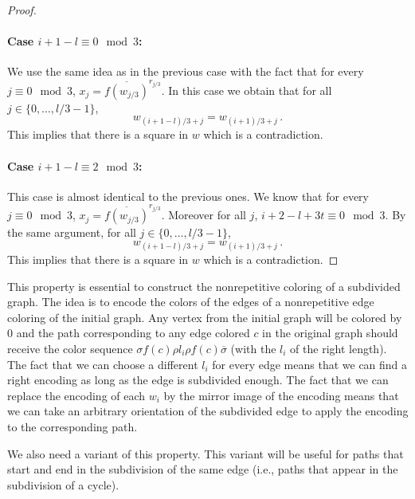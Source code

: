 \documentclass[a4paper,12pt]{article}
\newcommand{\pal}{\rho}
\newcommand{\hpal}{\sigma}
\begin{document}
\begin{proof}
\paragraph{Case $i+1-l\equiv 0 \mod 3$:} We use the same idea as in the previous case with the fact that for every $j\equiv 0\mod 3$, $x_j= \overline {f(w_{j/3})}^{r_{j/3}}$. In this case we obtain that for all  $j\in\{0,\ldots, l/3-1\}$, $$w_{(i+1-l)/3+j}=w_{(i+1)/3+j}\,.$$
This implies that there is a square in $w$ which is a contradiction.


\paragraph{Case $i+1-l\equiv 2 \mod 3$:} This case is almost identical to the previous ones. We know that for every $j\equiv 0\mod 3$, $x_j= \overline {f(w_{j/3})}^{r_{j/3}}$. Moreover for all  $j$,
$i+2-l+3t\equiv 0 \mod 3$. By the same argument, for all  $j\in\{0,\ldots, l/3-1\}$, $$w_{(i+1-l)/3+j}=w_{(i+1)/3+j}\,.$$
This implies that there is a square in $w$ which is a contradiction.
\end{proof}

This property is essential to construct the nonrepetitive coloring of a subdivided graph. The idea is to encode the colors of the edges of a nonrepetitive edge coloring of the initial graph. Any vertex from the initial graph will be colored by $0$ and the path corresponding to any edge colored $c$ in the original graph should receive the color sequence $\hpal f(c) \pal l_i \pal f(c) \overline{\hpal}$ (with the $l_i$ of the right length). The fact that we can choose a different $l_i$ for every edge means that we can find a right encoding as long as the edge is subdivided enough. 
The fact that we can replace the encoding of each $w_i$ by the mirror image of the encoding means that we can take an arbitrary orientation of the subdivided edge to apply the encoding to the corresponding path.

We also need a variant of this property. This variant will be useful for paths that start and end in the subdivision of the same edge (i.e., paths that appear in the subdivision of a cycle).
\end{document}
